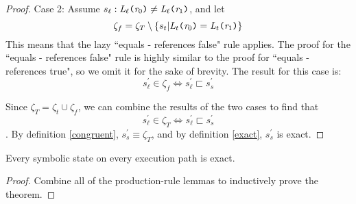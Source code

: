 \begin{proof}
Case 2: Assume $s_\ell : \emph{L}_\ell \texttt{(} \emph{r}_0\texttt{)} \neq \emph{L}_\ell \texttt{(} \emph{r}_1 \texttt{)}$, and let 
$$\zeta_f = \zeta_T \setminus \{ s_t | \emph{L}_t \texttt{(} \emph{r}_0\texttt{)} = \emph{L}_t \texttt{(} \emph{r}_1 \texttt{)} \}$$ 
This means that the lazy ``equals - references false" rule applies. The proof for the ``equals - references false" rule is highly similar to the proof for ``equals - references true", so we omit it for the sake of brevity. The result for this case is:
$$s_\ell^\prime \in \zeta_f \Leftrightarrow s_\ell^\prime \sqsubset s_s^\prime$$

Since $\zeta_T = \zeta_t \cup \zeta_f$, we can combine the results of the two cases to find that $$s_\ell^\prime \in \zeta_T \Leftrightarrow s_\ell^\prime \sqsubset s_s^\prime$$. By definition \ref{congruent}, $s_s^\prime \equiv \zeta_T$, and by definition \ref{exact}, $s_s^\prime$ is exact.
\end{proof}

\begin{theorem}
Every symbolic state on every execution path is exact.
\end{theorem}
\begin{proof}
Combine all of the production-rule lemmas to inductively prove the theorem.
\end{proof}
